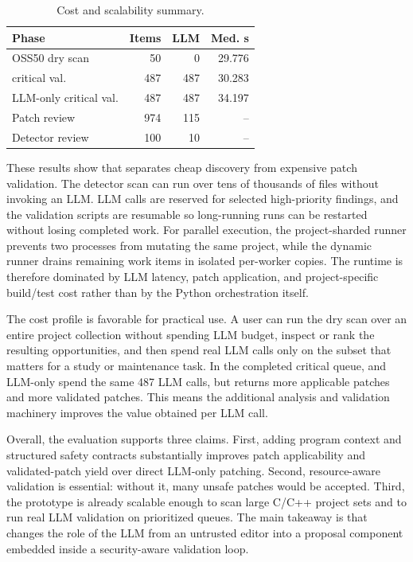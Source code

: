\begin{table}[t]
  \centering
  \caption{Cost and scalability summary.}
  \label{tab:eval-cost}
  \scriptsize
  \begin{tabular}{@{}p{}rrr@{}}
    \toprule
    \textbf{Phase} & \textbf{Items} & \textbf{LLM} & \textbf{Med. s} \\
    \midrule
    OSS50 dry scan & 50 & 0 & 29.776 \\
    \SysName{} critical val. & 487 & 487 & 30.283 \\
    LLM-only critical val. & 487 & 487 & 34.197 \\
    Patch review & 974 & 115 & -- \\
    Detector review & 100 & 10 & -- \\
    \bottomrule
  \end{tabular}
\end{table}

These results show that \SysName{} separates cheap discovery from expensive
patch validation. The detector scan can run over tens of thousands of files
without invoking an LLM. LLM calls are reserved for selected high-priority
findings, and the validation scripts are resumable so long-running runs can be
restarted without losing completed work. For parallel execution, the
project-sharded runner prevents two processes from mutating the same project,
while the dynamic runner drains remaining work items in isolated per-worker
copies. The runtime is therefore dominated by LLM latency, patch application,
and project-specific build/test cost rather than by the Python orchestration
itself.

The cost profile is favorable for practical use. A user can run the dry scan
over an entire project collection without spending LLM budget, inspect or rank
the resulting opportunities, and then spend real LLM calls only on the subset
that matters for a study or maintenance task. In the completed critical queue,
\SysName{} and LLM-only spend the same 487 LLM calls, but \SysName{} returns
more applicable patches and more validated patches. This means the additional
analysis and validation machinery improves the value obtained per LLM call.

Overall, the evaluation supports three claims. First, adding program context and
structured safety contracts substantially improves patch applicability and
validated-patch yield over direct LLM-only patching. Second, resource-aware
validation is essential: without it, many unsafe patches would be accepted.
Third, the prototype is already scalable enough to scan large C/C++ project
sets and to run real LLM validation on prioritized queues. The main takeaway is
that \SysName{} changes the role of the LLM from an untrusted editor into a
proposal component embedded inside a security-aware validation loop.
